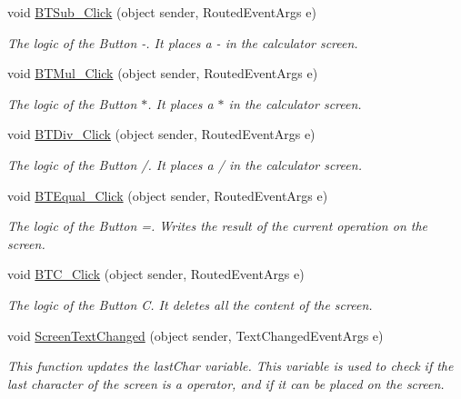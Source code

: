 \begin{DoxyCompactItemize}
void \mbox{\hyperlink{class_p_a_c4_______calculadora_1_1_main_window_ade34438d63aa3adde73f310bb3d17d76}{B\+T\+Sub\+\_\+\+Click}} (object sender, Routed\+Event\+Args e)
\begin{DoxyCompactList}\small\item\em The logic of the Button -\/. It places a -\/ in the calculator screen. \end{DoxyCompactList}\item 
void \mbox{\hyperlink{class_p_a_c4_______calculadora_1_1_main_window_a96f6c37dea4ee95cb9c12a9d0383f258}{B\+T\+Mul\+\_\+\+Click}} (object sender, Routed\+Event\+Args e)
\begin{DoxyCompactList}\small\item\em The logic of the Button $\ast$. It places a $\ast$ in the calculator screen. \end{DoxyCompactList}\item 
void \mbox{\hyperlink{class_p_a_c4_______calculadora_1_1_main_window_ae54986bf1f0aeae9fd7906fd69367088}{B\+T\+Div\+\_\+\+Click}} (object sender, Routed\+Event\+Args e)
\begin{DoxyCompactList}\small\item\em The logic of the Button /. It places a / in the calculator screen. \end{DoxyCompactList}\item 
void \mbox{\hyperlink{class_p_a_c4_______calculadora_1_1_main_window_ac9834bfd83a9c94fdf74966604b9bbcf}{B\+T\+Equal\+\_\+\+Click}} (object sender, Routed\+Event\+Args e)
\begin{DoxyCompactList}\small\item\em The logic of the Button =. Writes the result of the current operation on the screen. \end{DoxyCompactList}\item 
void \mbox{\hyperlink{class_p_a_c4_______calculadora_1_1_main_window_aba0b6892ba944cca1a6fc4bb0b1b35ca}{B\+T\+C\+\_\+\+Click}} (object sender, Routed\+Event\+Args e)
\begin{DoxyCompactList}\small\item\em The logic of the Button C. It deletes all the content of the screen. \end{DoxyCompactList}\item 
void \mbox{\hyperlink{class_p_a_c4_______calculadora_1_1_main_window_a7d2be16992dd5a6df70be40c4d9d0dfd}{Screen\+Text\+Changed}} (object sender, Text\+Changed\+Event\+Args e)
\begin{DoxyCompactList}\small\item\em This function updates the last\+Char variable. This variable is used to check if the last character of the screen is a operator, and if it can be placed on the screen. \end{DoxyCompactList}\item 

\end{DoxyCompactItemize}
